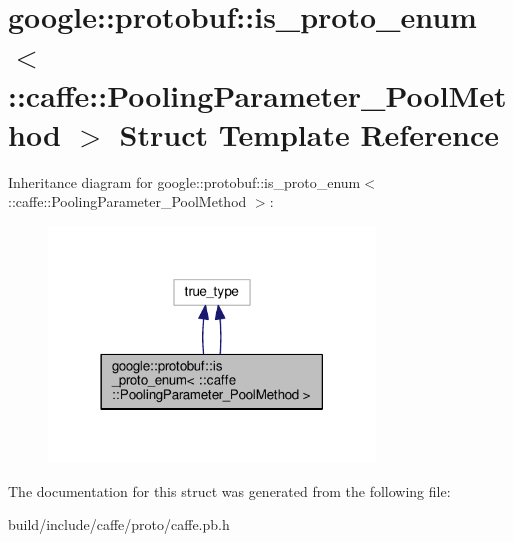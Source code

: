 \hypertarget{structgoogle_1_1protobuf_1_1is__proto__enum_3_01_1_1caffe_1_1_pooling_parameter___pool_method_01_4}{}\section{google\+:\+:protobuf\+:\+:is\+\_\+proto\+\_\+enum$<$ \+:\+:caffe\+:\+:Pooling\+Parameter\+\_\+\+Pool\+Method $>$ Struct Template Reference}
\label{structgoogle_1_1protobuf_1_1is__proto__enum_3_01_1_1caffe_1_1_pooling_parameter___pool_method_01_4}


Inheritance diagram for google\+:\+:protobuf\+:\+:is\+\_\+proto\+\_\+enum$<$ \+:\+:caffe\+:\+:Pooling\+Parameter\+\_\+\+Pool\+Method $>$\+:
\nopagebreak
\begin{figure}[H]
\begin{center}
\leavevmode
\includegraphics[width=246pt]{structgoogle_1_1protobuf_1_1is__proto__enum_3_01_1_1caffe_1_1_pooling_parameter___pool_method_01_4__inherit__graph}
\end{center}
\end{figure}


The documentation for this struct was generated from the following file\+:\begin{DoxyCompactItemize}
\item 
build/include/caffe/proto/caffe.\+pb.\+h\end{DoxyCompactItemize}
